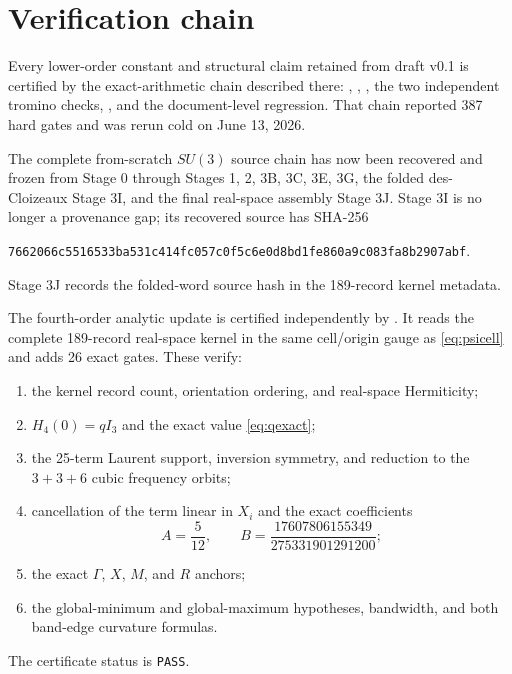 \documentclass[11pt]{article}
\begin{document}
\appendix
\section{Verification chain}
\label{app:verification}

Every lower-order constant and structural claim retained from draft v0.1 is
certified by the exact-arithmetic chain described there:
, ,
, the two independent tromino checks,
, and the
document-level regression. That chain reported 387 hard gates and was rerun
cold on June 13, 2026.

The complete from-scratch $SU(3)$ source chain has now been recovered and
frozen from Stage 0 through Stages 1, 2, 3B, 3C, 3E, 3G, the folded
des-Cloizeaux Stage 3I, and the final real-space assembly Stage 3J. Stage 3I
is no longer a provenance gap; its recovered source has SHA-256
\begin{center}
\texttt{7662066c5516533ba531c414fc057c0f5c6e0d8bd1fe860a9c083fa8b2907abf}.
\end{center}
Stage 3J records the folded-word source hash in the 189-record kernel metadata.

The fourth-order analytic update is certified independently by
. It reads the
complete 189-record real-space kernel in the same cell/origin gauge as
\eqref{eq:psicell} and adds 26 exact gates. These verify:
\begin{enumerate}
\item the kernel record count, orientation ordering, and real-space
Hermiticity;
\item $H_4(0)=qI_3$ and the exact value \eqref{eq:qexact};
\item the 25-term Laurent support, inversion symmetry, and reduction to the
$3+3+6$ cubic frequency orbits;
\item cancellation of the term linear in $X_i$ and the exact coefficients
\[
A=\frac5{12},\qquad
B=\frac{17607806155349}{275331901291200};
\]
\item the exact $\Gamma$, $X$, $M$, and $R$ anchors;
\item the global-minimum and global-maximum hypotheses, bandwidth, and both
band-edge curvature formulas.
\end{enumerate}
The certificate status is \texttt{PASS}.
\end{document}
